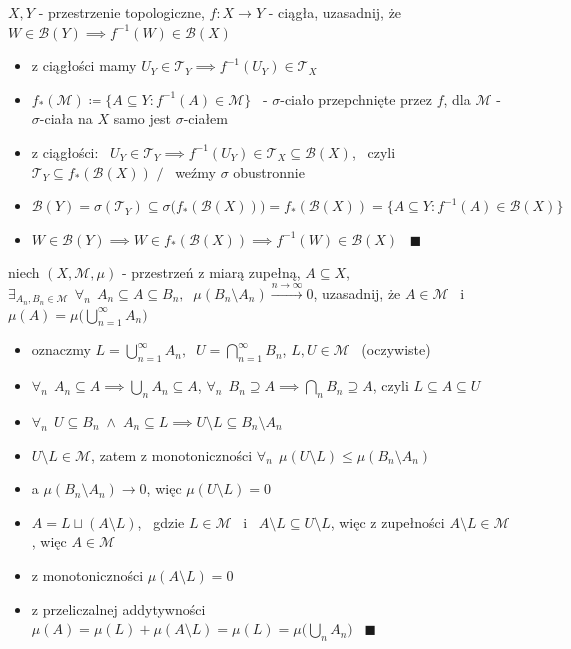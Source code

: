 \documentclass[a4paper,12pt]{article}
\begin{document}
\bigskip
{} \; \(X, Y\) - przestrzenie topologiczne, \; \(f: X \to Y\) - ciągła, \; uzasadnij, że \(W \in \mathcal{B}(Y) \implies f^{-1}(W) \in \mathcal{B}(X)\)
\begin{itemize}
    \item z ciągłości mamy \(U_Y \in \mathcal{T}_Y \implies f^{-1}(U_Y) \in \mathcal{T}_X\)
    \item \(f_*(\mathcal{M}) \coloneqq \{A \subseteq Y : f^{-1}(A) \in \mathcal{M}\}\) \, - \(\sigma\)-ciało przepchnięte przez \(f\), \; dla \(\mathcal{M}\) - \(\sigma\)-ciała na \(X\) samo jest \(\sigma\)-ciałem
    \item z ciągłości: \, \(U_Y \in \mathcal{T}_Y \implies f^{-1}(U_Y) \in \mathcal{T}_X \subseteq \mathcal{B}(X)\), \, czyli \(\mathcal{T}_Y \subseteq f_*(\mathcal{B}(X))\) \quad \(\big/\) \, weźmy \(\sigma\) obustronnie
    \item \(\mathcal{B}(Y) = \sigma(\mathcal{T}_Y) \subseteq \sigma\big(f_*(\mathcal{B}(X))\big) = f_*(\mathcal{B}(X)) = \{A \subseteq Y : f^{-1}(A) \in \mathcal{B}(X)\}\)
    \item \(W \in \mathcal{B}(Y) \implies W \in f_*(\mathcal{B}(X)) \implies f^{-1}(W) \in \mathcal{B}(X)\) \, \(\blacksquare\)
\end{itemize}

\bigskip
{} \; niech \((X, \mathcal{M}, \mu)\) - przestrzeń z miarą zupełną, \; \(A \subseteq X\), \; \(\exists_{A_n, B_n \in \mathcal{M}} \;\, \forall_n \;\, A_n \subseteq A \subseteq B_n, \;\; \mu(B_n \setminus A_n) \xrightarrow{n \to \infty} 0\), \; uzasadnij, że \(A \in \mathcal{M}\) \, i \, \(\mu(A) = \mu\big(\bigcup_{n=1}^{\infty} A_n\big)\)
\begin{itemize}
    \item oznaczmy \(L = \bigcup_{n=1}^{\infty} A_n, \;\; U = \bigcap_{n=1}^{\infty} B_n\), \; \(L, U \in \mathcal{M}\) \, (oczywiste)
    \item \(\forall_n \;\, A_n \subseteq A \implies \bigcup_n A_n \subseteq A\), \; \(\forall_n \;\, B_n \supseteq A \implies \bigcap_n B_n \supseteq A\), \; czyli \(L \subseteq A \subseteq U\)
    \item \(\forall_n \;\, U \subseteq B_n \;\land\; A_n \subseteq L \implies U \setminus L \subseteq B_n \setminus A_n\)
    \item \(U \setminus L \in \mathcal{M}\), zatem z monotoniczności \(\forall_n \;\, \mu(U \setminus L) \leq \mu(B_n \setminus A_n)\)
    \item a \(\mu(B_n \setminus A_n) \to 0\), więc \(\mu(U \setminus L) = 0\)
    \item \(A = L \sqcup (A \setminus L)\), \, gdzie \(L \in \mathcal{M}\) \, i \, \(A \setminus L \subseteq U \setminus L\), więc z zupełności \(A \setminus L \in \mathcal{M}\), więc \(A \in \mathcal{M}\)
    \item z monotoniczności \(\mu(A \setminus L) = 0\)
    \item z przeliczalnej addytywności \(\mu(A) = \mu(L) + \mu(A \setminus L) = \mu(L) = \mu\big(\bigcup_n A_n\big)\) \, \(\blacksquare\)
\end{itemize}
\end{document}
